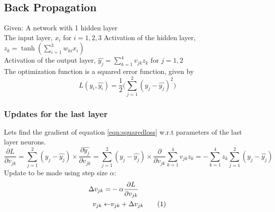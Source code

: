 \documentclass[letter,doc,notimes]{article}
\newcommand\numberthis{\addtocounter{equation}{1}\tag{\theequation}}
\begin{document}
\subsection{Back Propagation}
Given: A network with 1 hidden layer\\
The input layer, $x_i$ for $i=1,2,3$
Activation of the hidden layer, $z_k = \tanh(\sum_{i=1}^{3} w_{ki}x_i)$ \\
Activation of the output layer, $\hat{y_j} = \sum_{k=1}^{4} v_{jk}z_k$ for $j = 1, 2$ \\
The optimization function is a squared error function, given by
\begin{equation} \label{eqn:squaredloss}
	L(y_i, \hat{y_i}) = \frac{1}{2} \big( \sum_{j=1}^{2}(y_j - \hat{y_j})^2 \big) 
\end{equation}

\subsubsection{Updates for the last layer}
Lets find the gradient of equation \ref{eqn:squaredloss} w.r.t parameters of the last layer neurons.
\begin{equation}
 \frac{\partial L}{\partial v_{jk}} = \sum_{j=1}^{2}(y_j - \hat{y_j}) \times \frac{\partial \hat{y_j}}{\partial v_{jk}} = \sum_{j=1}^{2}(y_j - \hat{y_j}) \times \frac{\partial }{\partial v_{jk}} \sum_{k=1}^{4} v_{jk}z_k  = - \sum_{k=1}^{4} z_k \sum_{j=1}^{2}(y_j - \hat{y_j}) 
\end{equation}
Update to be made using step size $\alpha$: 
\begin{align*}
 \Delta v_{jk}  = & - \alpha \frac{\partial L}{\partial v_{jk}}  \\
 v_{jk} \leftarrow &  v_{jk}  + \Delta v_{jk} \numberthis
\end{align*}
\end{document}

